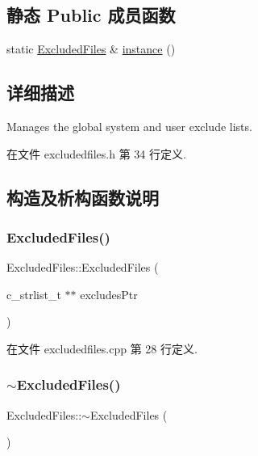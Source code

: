 \subsection*{静态 Public 成员函数}
\begin{DoxyCompactItemize}
\item 
static \hyperlink{class_o_c_c_1_1_excluded_files}{Excluded\+Files} \& \hyperlink{class_o_c_c_1_1_excluded_files_ac7ec470473506ddcddb4ef83f20c6df0}{instance} ()
\end{DoxyCompactItemize}


\subsection{详细描述}
Manages the global system and user exclude lists. 

在文件 excludedfiles.\+h 第 34 行定义.



\subsection{构造及析构函数说明}
\mbox{\label{class_o_c_c_1_1_excluded_files_af374d99e037621fe638dfa33c89bf095}} 
\subsubsection{\texorpdfstring{Excluded\+Files()}{ExcludedFiles()}}
{\footnotesize\ttfamily Excluded\+Files\+::\+Excluded\+Files (\begin{DoxyParamCaption}\item[{c\+\_\+strlist\+\_\+t $\ast$$\ast$}]{excludes\+Ptr }\end{DoxyParamCaption})}



在文件 excludedfiles.\+cpp 第 28 行定义.

\mbox{\label{class_o_c_c_1_1_excluded_files_afae534d13d17cebef5739e1efebbd3c6}} 
\subsubsection{\texorpdfstring{$\sim$\+Excluded\+Files()}{~ExcludedFiles()}}
{\footnotesize\ttfamily Excluded\+Files\+::$\sim$\+Excluded\+Files (\begin{DoxyParamCaption}{ }\end{DoxyParamCaption})}



